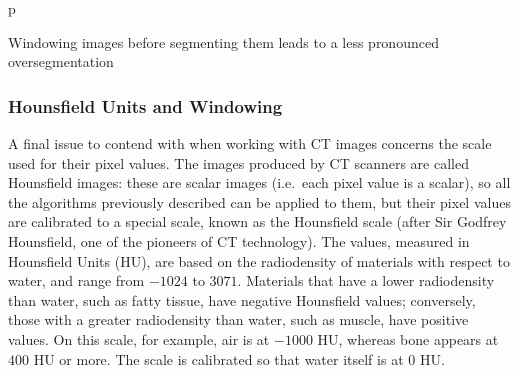 \begin{stusubfig}{p}
	\hspace{4mm}%
\caption{Windowing images before segmenting them leads to a less pronounced oversegmentation}
\label{fig:segmentation-watershed-hounsfieldvswindowed}
\end{stusubfig}

\subsubsection{Hounsfield Units and Windowing}

A final issue to contend with when working with CT images concerns the scale used for their pixel values. The images produced by CT scanners are called Hounsfield images: these are scalar images (i.e.~each pixel value is a scalar), so all the algorithms previously described can be applied to them, but their pixel values are calibrated to a special scale, known as the Hounsfield scale (after Sir Godfrey Hounsfield, one of the pioneers of CT technology). The values, measured in Hounsfield Units (HU), are based on the radiodensity of materials with respect to water, and range from $-1024$ to $3071$. Materials that have a lower radiodensity than water, such as fatty tissue, have negative Hounsfield values; conversely, those with a greater radiodensity than water, such as muscle, have positive values. On this scale, for example, air is at $-1000$ HU, whereas bone appears at $400$ HU or more. The scale is calibrated so that water itself is at $0$ HU.

